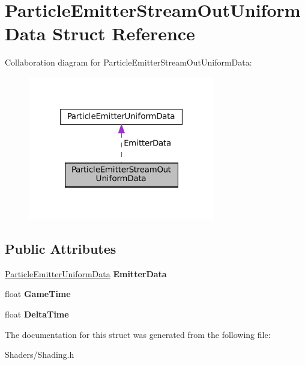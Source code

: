 \hypertarget{structParticleEmitterStreamOutUniformData}{}\section{Particle\+Emitter\+Stream\+Out\+Uniform\+Data Struct Reference}
\label{structParticleEmitterStreamOutUniformData}


Collaboration diagram for Particle\+Emitter\+Stream\+Out\+Uniform\+Data\+:
\nopagebreak
\begin{figure}[H]
\begin{center}
\leavevmode
\includegraphics[width=232pt]{structParticleEmitterStreamOutUniformData__coll__graph}
\end{center}
\end{figure}
\subsection*{Public Attributes}
\begin{DoxyCompactItemize}
\item 
\mbox{\label{structParticleEmitterStreamOutUniformData_a3525510033451af89910571399e8c440}} 
\hyperlink{structParticleEmitterUniformData}{Particle\+Emitter\+Uniform\+Data} {\bfseries Emitter\+Data}
\item 
\mbox{\label{structParticleEmitterStreamOutUniformData_a8c21ebe319650125eb50d21c4b361338}} 
float {\bfseries Game\+Time}
\item 
\mbox{\label{structParticleEmitterStreamOutUniformData_a31eb5f2800c7d480658247e34490d791}} 
float {\bfseries Delta\+Time}
\end{DoxyCompactItemize}


The documentation for this struct was generated from the following file\+:\begin{DoxyCompactItemize}
\item 
Shaders/Shading.\+h\end{DoxyCompactItemize}
